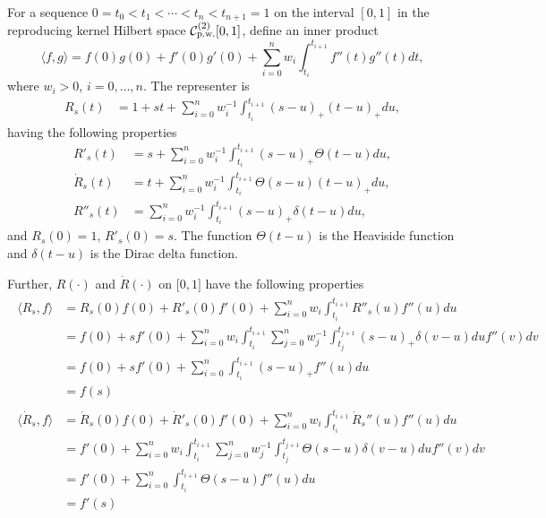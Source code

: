 For a sequence $0=t_0 < t_1<\cdots <t_n <t_{n+1}=1$ on the interval $[0,1]$ in the reproducing kernel Hilbert space  $\mathcal{C}_{\mbox{\scriptsize p.w.}}^{(2)}[0,1]$, define an inner product 
\begin{equation}\label{nontrivialInner}
\langle f,g\rangle = f(0)g(0)+f'(0)g'(0)+\sum_{i=0}^{n}w_i\int_{t_i}^{t_{i+1}}f''(t)g''(t)dt,
\end{equation}
where $w_i>0$, $i=0,\ldots,n$. The representer is 
\begin{align}
R_s(t) &= 1+st+\sum_{i=0}^{n}w_i^{-1}\int_{t_i}^{t_{i+1}}(s-u)_+(t-u)_+du, 
\end{align}
having the following properties 
\begin{align}
R'_s(t) &= s+\sum_{i=0}^{n}w_i^{-1}\int_{t_i}^{t_{i+1}}(s-u)_+\Theta(t-u) du,\\
\dot{R}_s(t) &= t+\sum_{i=0}^{n}w_i^{-1}\int_{t_i}^{t_{i+1}}\Theta(s-u)(t-u)_+ du,\\
R''_s(t) & = \sum_{i=0}^{n}w_i^{-1}\int_{t_i}^{t_{i+1}}(s-u)_+\delta(t-u)du, 
\end{align}
and $R_s(0)=1$, $R'_s(0)=s$. The function $\Theta(t-u)$ is the Heaviside function and $\delta(t-u)$ is the Dirac delta function. 

Further, $R(\cdot)$ and $\dot{R}(\cdot)$ on $\lbrack0,1\rbrack$ have the following properties 
\begin{align}
\begin{split}
\langle R_s, f \rangle &= R_s(0)f(0)+R'_s(0)f'(0)+\sum_{i=0}^{n}w_i\int_{t_i}^{t_{i+1}}R''_s(u)f''(u)du\\
&=f(0)+sf'(0)+\sum_{i=0}^{n}w_i \int_{t_i}^{t_{i+1}}  \sum_{j=0}^n w_j^{-1} \int_{t_j}^{t_{j+1}} (s-u)_+\delta(v-u)du f''(v)dv\\
&= f(0)+sf'(0)+\sum_{i=0}^n\int_{t_i}^{t_{i+1}}(s-u)_+f''(u)du \\
&=f(s)
\end{split} \\
\begin{split}
\langle \dot{R}_s, f \rangle &= \dot{R}_s(0)f(0)+\dot{R}'_s(0)f'(0)+\sum_{i=0}^{n}w_i\int_{t_i}^{t_{i+1}}\dot{R}_s''(u)f''(u)du\\
&=f'(0)+\sum_{i=0}^{n}w_i \int_{t_i}^{t_{i+1}}  \sum_{j=0}^n w_j^{-1} \int_{t_j}^{t_{j+1}} \Theta(s-u)\delta(v-u)du f''(v)dv\\
&=f'(0)+\sum_{i=0}^n\int_{t_i}^{t_{i+1}}\Theta(s-u)f''(u)du \\
&=f'(s)
\end{split}
\end{align}

